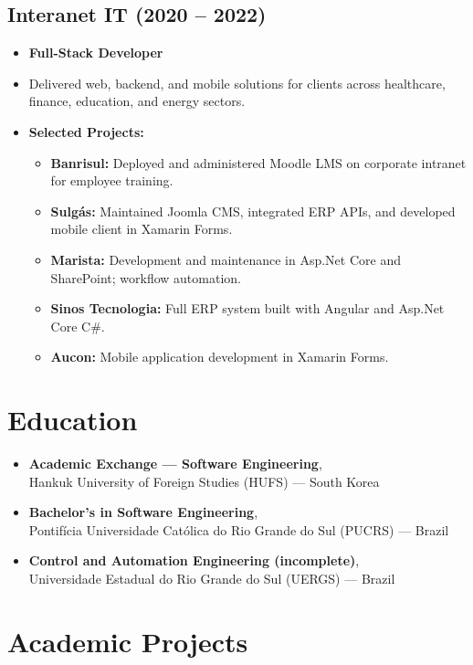 \documentclass[a4paper,10pt]{article}
\begin{document}
\subsection*{Interanet IT (2020 -- 2022)}
\begin{itemize}[leftmargin=1cm]
    \item \textbf{Full-Stack Developer}
    \item Delivered web, backend, and mobile solutions for clients across healthcare, finance, education, and energy sectors.
    \item \textbf{Selected Projects:}
    \begin{itemize}
        \item \textbf{Banrisul:} Deployed and administered Moodle LMS on corporate intranet for employee training.
        \item \textbf{Sulgás:} Maintained Joomla CMS, integrated ERP APIs, and developed mobile client in Xamarin Forms.
        \item \textbf{Marista:} Development and maintenance in Asp.Net Core and SharePoint; workflow automation.
        \item \textbf{Sinos Tecnologia:} Full ERP system built with Angular and Asp.Net Core C\#.
        \item \textbf{Aucon:} Mobile application development in Xamarin Forms.
    \end{itemize}
\end{itemize}

\section*{Education}

\begin{itemize}[leftmargin=2cm]
    \item[2026] \textbf{Academic Exchange --- Software Engineering}, \\
    Hankuk University of Foreign Studies (HUFS) --- South Korea
    \item[2023--Now] \textbf{Bachelor's in Software Engineering}, \\
    Pontifícia Universidade Católica do Rio Grande do Sul (PUCRS) --- Brazil
    \item[2020--2022] \textbf{Control and Automation Engineering (incomplete)}, \\
    Universidade Estadual do Rio Grande do Sul (UERGS) --- Brazil
\end{itemize}

\section*{Academic Projects}
\end{document}
